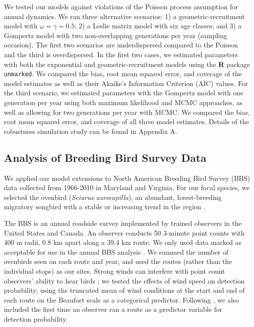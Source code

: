 \documentclass[12pt,english]{article}
\begin{document}
\begin{spacing}{1.9}
\begin{flushleft}
We tested our models against violations of the Poisson process assumption for
annual dynamics.  We ran three alternative scenarios: 1) a geometric-recruitment model with
$\omega = \gamma = 0.5$; 2) a Leslie matrix model with six age classes; and 3) 
a Gompertz model with two non-overlapping generations per year (sampling occasion).   
The first two scenarios are underdispersed compared to the Poisson and the third is overdispersed.
In the first two cases, we estimated parameters with both the exponential and geometric-recruitment
models using the \textbf{R} package \texttt{unmarked}.  We compared the bias,
root mean squared error, and coverage of the model estimates as well as their Akaike's Information
Criterion (AIC) values.
For the third scenario, we estimated parameters with the Gompertz model with 
one generation per year using both maximum likelihood and MCMC approaches, as well
as allowing for two generations per year with MCMC.  We compared the bias, root mean
squared error, and coverage of all three model estimates.  Details of the robustness simulation
study can be found in Appendix A.

\subsection*{Analysis of Breeding Bird Survey Data}

We applied our model extensions to North American Breeding Bird Survey
(BBS) data collected from 1966-2010 in 
Maryland and Virginia. For our focal species, we selected the
ovenbird (\textit{Seiurus aurocapilla}), an abundant, %
forest-breeding migratory songbird with a stable or increasing trend
in the region \citep{porneluzi_etal:2011}. 

The BBS is an annual roadside survey implemented by trained
observers in the United States and Canada. An observer conducts 50
3-minute point counts with 400 m radii, 0.8 km apart 
along a
39.4 km route. We only used data marked as acceptable for use in the annual BBS
analysis \citep{sauer_etal:1994auk}.  We summed the number of ovenbirds
seen on each route and year, and used the routes (rather
than the individual stops) as our sites.
Strong winds can interfere with point count observers' ability
to hear birds \citep{simons_etal:2007}; we tested the effects of wind
speed on detection probability, using the truncated mean of wind conditions at the start and end of
each route on the Beaufort scale as a categorical predictor. 
Following \citet{link_sauer:2002},
we also included the first time an observer ran a route as a predictor variable for detection
probability.
 

\end{flushleft}
\end{spacing}
\end{document}
